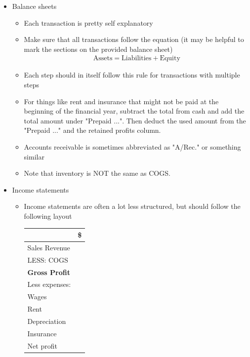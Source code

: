 \documentclass{article}
\begin{document}
		\begin{itemize}
			\item Balance sheets
				\begin{itemize}
					\item Each transaction is pretty self explanatory
					\item Make sure that all transactions follow the equation (it may be helpful to mark the sections on the provided balance sheet)
						\begin{align*}
							\text{Assets} = \text{Liabilities} + \text{Equity}
						\end{align*}
					\item Each step should in itself follow this rule for transactions with multiple steps
					\item For things like rent and insurance that might not be paid at the beginning of the financial year, subtract the total from cash and add the total amount under "Prepaid ...". Then deduct the used amount from the "Prepaid ..." and the retained profits column.
					\item Accounts receivable is sometimes abbreviated as "A/Rec." or something similar
					\item Note that inventory is NOT the same as COGS. 
				\end{itemize}
			\item Income statements
				\begin{itemize}
					\item Income statements are often a lot less structured, but should follow the following layout
						\begin{table}[H]
							\centering
							\begin{tabular}[c]{p{5cm}|p{5cm}}
								\hline
										& \multicolumn{1}{c}{\$}		\\
								\hline
								Sales Revenue	&	\\
								LESS: COGS	&	\\
								\textbf{Gross Profit}	&	\\
								\hline
								Less expenses:	&	\\
								\qquad Wages	&	\\
								\qquad Rent	&	\\
								\qquad Depreciation	&	\\
								\qquad Insurance	&	\\
								\hline
								Net profit & \\
								\hline
							\end{tabular}
						\end{table}
						

\end{itemize}
\end{itemize}
\end{document}
